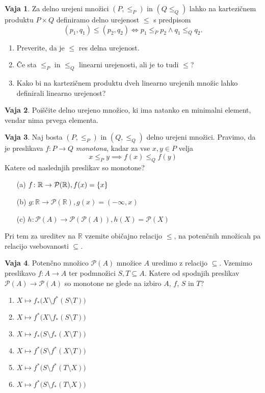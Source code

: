 \documentclass{article}
\newcommand{\RR}{\mathbb{R}}
\theoremstyle{definition}
\newtheorem{vaja}{Vaja}
\begin{document}
\begin{vaja}
  Za delno urejeni množici $(P, \leq_P)$ in $(Q \leq_Q)$ lahko na kartezičnem produktu $P \times Q$ definiramo delno urejenost $\leq$ s predpisom
  \[(p_1, q_1) \leq (p_2, q_2) \iff p_1 \leq_P p_2 \land q_1 \leq_Q q_2.\]
  \begin{enumerate}
    \item Preverite, da je $\leq$ res delna urejenost.
    \item Če sta $\leq_P$ in $\leq_Q$ linearni urejenosti, ali je to tudi $\leq$?
    \item Kako bi na kartezičnem produktu dveh linearno urejenih množic lahko definirali linearno urejenost?
  \end{enumerate}
\end{vaja}

\begin{vaja}
  Poiščite delno urejeno množico, ki ima natanko en minimalni element, vendar nima prvega elementa.
\end{vaja}

\begin{vaja}
  Naj bosta $(P, \leq_P)$ in $(Q, \leq_Q)$ delno urejeni množici. Pravimo, da je preslikava $f\colon P \to Q$ \emph{monotona}, kadar za vse $x, y \in P$ velja
  \[x \leq_P y \implies f(x) \leq_Q f(y)\]
  Katere od naslednjih preslikav so monotone?
  \begin{enumerate}
    \item[(a)] $f \colon \RR \to \mathcal{P}(\RR), f(x) = \set{x}$
    \item[(b)] $g \colon \RR \to \mathcal{P}(\RR), g(x) = (-\infty, x)$
    \item[(c)] $h \colon \mathcal{P}(A) \to \mathcal{P}(\mathcal{P}(A)), h(X) = \mathcal{P}(X)$
  \end{enumerate}
  Pri tem za ureditev na $\RR$ vzemite običajno relacijo $\leq$, na potenčnih množicah pa relacijo vsebovanosti $\subseteq$.
\end{vaja}

\begin{vaja}
  Potenčno množico $\mathcal{P}(A)$ množice $A$ uredimo z relacijo $\subseteq$. Vzemimo preslikavo $f\colon A \to A$ ter podmnožici $S, T \subseteq A$. Katere od spodnjih preslikav $\mathcal{P}(A) \to \mathcal{P}(A)$ so monotone ne glede na izbiro $A$, $f$, $S$ in $T$?
  \begin{enumerate}
    \item $X \mapsto f_*\big(X \setminus f^*(S \setminus T)\big)$
    \item $X \mapsto f^*\big(X \setminus f_*(S \setminus T)\big)$
    \item $X \mapsto f_*\big(S \setminus f_*(X \setminus T)\big)$
    \item $X \mapsto f^*\big(S \setminus f^*(X \setminus T)\big)$
    \item $X \mapsto f^*\big(S \setminus f^*(T \setminus X)\big)$
    \item $X \mapsto f^*\big(S \setminus f_*(T \setminus X)\big)$
  \end{enumerate}
\end{vaja}
\end{document}
